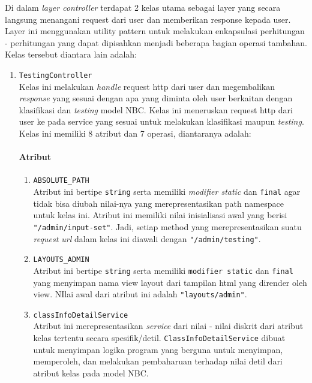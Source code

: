 Di dalam \textit{layer controller} terdapat 2 kelas utama sebagai layer yang secara langsung menangani request dari user dan memberikan response kepada user. Layer ini menggunakan utility pattern untuk melakukan enkapsulasi perhitungan - perhitungan yang dapat dipisahkan menjadi beberapa bagian operasi tambahan. Kelas tersebut diantara lain adalah:
\begin{enumerate}
	\item \texttt{TestingController}\\
	Kelas ini melakukan \textit{handle} request http dari user dan megembalikan \textit{response} yang sesuai dengan apa yang diminta oleh user berkaitan dengan klasifikasi dan \textit{testing} model NBC. Kelas ini meneruskan request http dari user ke pada service yang sesuai untuk melakukan klasifikasi maupun \textit{testing}. Kelas ini memiliki 8 atribut dan 7 operasi, diantaranya adalah:
	\paragraph{Atribut}
		\begin{enumerate}
			\item \verb|ABSOLUTE_PATH|\\
			Atribut ini bertipe \texttt{string} serta memiliki \textit{modifier static} dan \texttt{final} agar tidak bisa diubah nilai-nya yang merepresentasikan path namespace untuk kelas ini. Atribut ini memiliki nilai inisialisasi awal yang berisi \texttt{"/admin/input-set"}. Jadi, setiap method yang merepresentasikan suatu \textit{request url} dalam kelas ini diawali dengan \texttt{"/admin/testing"}.

			\item \verb|LAYOUTS_ADMIN|\\
			Atribut ini bertipe \texttt{string} serta memiliki \texttt{modifier static} dan \texttt{final} yang menyimpan nama view layout dari tampilan html yang dirender oleh view. NIlai awal dari atribut ini adalah \texttt{"layouts/admin"}.


			\item \texttt{classInfoDetailService}\\
			Atribut ini merepresentasikan \textit{service} dari nilai - nilai diskrit dari atribut kelas tertentu secara spesifik/detil. \texttt{ClassInfoDetailService} dibuat untuk menyimpan logika program yang berguna untuk menyimpan, memperoleh, dan melakukan pembaharuan terhadap nilai detil dari atribut kelas pada model NBC.


\end{enumerate}
\end{enumerate}
